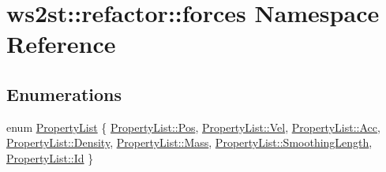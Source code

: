 \hypertarget{namespacews2st_1_1refactor_1_1forces}{}\section{ws2st\+:\+:refactor\+:\+:forces Namespace Reference}
\label{namespacews2st_1_1refactor_1_1forces}
\subsection*{Enumerations}
\begin{DoxyCompactItemize}
\item 
enum \mbox{\hyperlink{namespacews2st_1_1refactor_1_1forces_aa7768922c14228c573972bab0cea0028}{Property\+List}} \{ \newline
\mbox{\hyperlink{namespacews2st_1_1refactor_1_1forces_aa7768922c14228c573972bab0cea0028afea4e0fe069dc6f6171dd6044abb2365}{Property\+List\+::\+Pos}}, 
\mbox{\hyperlink{namespacews2st_1_1refactor_1_1forces_aa7768922c14228c573972bab0cea0028aec930ca2dec8aa0b05a106add08d538e}{Property\+List\+::\+Vel}}, 
\mbox{\hyperlink{namespacews2st_1_1refactor_1_1forces_aa7768922c14228c573972bab0cea0028a2e02ea7283618d93898c1342e8361dfa}{Property\+List\+::\+Acc}}, 
\mbox{\hyperlink{namespacews2st_1_1refactor_1_1forces_aa7768922c14228c573972bab0cea0028a7e6d11dd9dbeef53c1cb3cb896bce476}{Property\+List\+::\+Density}}, 
\newline
\mbox{\hyperlink{namespacews2st_1_1refactor_1_1forces_aa7768922c14228c573972bab0cea0028aff2864d6f652ee0ac254814f1ae4f4a8}{Property\+List\+::\+Mass}}, 
\mbox{\hyperlink{namespacews2st_1_1refactor_1_1forces_aa7768922c14228c573972bab0cea0028a209c4a2539e3220aadbf61e605f9bfdc}{Property\+List\+::\+Smoothing\+Length}}, 
\mbox{\hyperlink{namespacews2st_1_1refactor_1_1forces_aa7768922c14228c573972bab0cea0028a490aa6e856ccf208a054389e47ce0d06}{Property\+List\+::\+Id}}
 \}
\end{DoxyCompactItemize}
